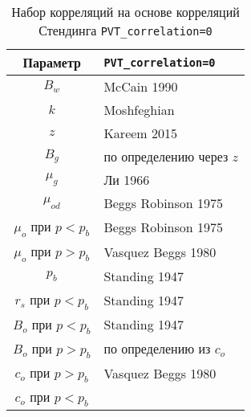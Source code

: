 \begin{table}[]
	\caption{Набор корреляций на основе корреляций Стендинга \texttt{PVT_correlation=0}}
	\label{table:PVT_correlations_Standing}
	\begin{tabular}{|c|l|}
		\hline
		Параметр & \texttt{PVT_correlation=0}   \\ \hline
		
		$B_w$ & McCain 1990 \cite{petrowiki_water_props, McCain_1991, McCain_1990}   \\ \hline
		
		$k$  &  Moshfeghian  \cite{PetroSkills_gas_heat_capacity}     \\ \hline
		
	 	$z$ &  Kareem 2015  \cite{Kareem_2015}       \\ \hline
	 	
	 	$B_g$  & по определению через $z$    \\ \hline
	 	
	 	$\mu_g$   & Ли 1966 \cite{petrowiki_gas_viscosity, Lee_1966}    \\ \hline
	 	
	 	$\mu_{od}$   & Beggs Robinson 1975 \cite{Beggs_Robinson_1975, petrowiki_oil_viscosity, Yukos_PVT_2002}    \\ \hline
	 	
	 	$\mu_{o}$ при $p<p_b$  & Beggs Robinson 1975 \cite{Beggs_Robinson_1975, petrowiki_oil_viscosity, Yukos_PVT_2002}      \\ \hline
	 	
	 	$\mu_{o}$ при $p>p_b$  & Vasquez Beggs 1980 \cite{Vazquez_Beggs_1980, petrowiki_oil_system_correlations, petrowiki_oil_viscosity_app_A_11_1, Yukos_PVT_2002}  \\ \hline
	 	
	 	$p_{b}$   & Standing 1947 \cite{Standing_1947,petrowiki_oil_system_correlations}      \\ \hline
	 	
	 	$r_{s}$ при $p<p_b$  & Standing 1947 \cite{Standing_1947,petrowiki_oil_system_correlations}          \\ \hline
	 	
	 	$B_o$ при $p<p_b$   &  Standing 1947 \cite{Standing_1947,petrowiki_oil_system_correlations}         \\ \hline
	 	
	 	$B_o$ при $p>p_b$   &  по определению из $c_o$        \\ \hline
	 	
	 	$c_o$ при $p>p_b$   &   Vasquez Beggs 1980 \cite{Vazquez_Beggs_1980, petrowiki_oil_system_correlations, petrowiki_oil_viscosity_app_A_11_1, Yukos_PVT_2002}        \\ \hline
	 	
	 	$c_o$ при $p<p_b$  &          \\ \hline
	\end{tabular}
\end{table}


